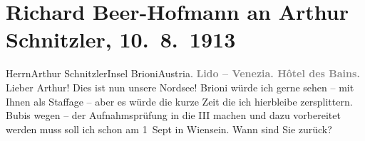 

         
         \renewcommand{\erwaehntePersonen}{Personen: Richard Beer-Hofmann, Gabriel Beer-Hofmann, Olga Schnitzler, Heinrich Schnitzler, Lili Schnitzler}
         \renewcommand{\erwaehnteOrte}{Orte: Brijuni, Grand Hotel des Bains, Lido, Santa Maria Elisabetta, Venedig, Wien, Österreich}
         \renewcommand{\erwaehnteWerke}{}
               \section[Richard Beer-Hofmann an Arthur Schnitzler, 10. 8. 1913]{ Richard Beer-Hofmann an Arthur Schnitzler, 10. 8. 1913}\nopagebreak{}\rehead{ }\begin{ledgroupsized}[t]{13cm}\normalsize\beginnumbering \toendnotes[C]{\smallbreak\pagebreak[2]} 
\toendnotes[C]{\smallbreak}\pstart{}{\pb}Herrn\pend{}\pstart{}Arthur Schnitzler\pend{}\pstart{}Insel Brioni\pend{}\pstart{}Austria.\pend{}{\bigskip}\pstart
           \noindent{}\centering{}{\pb}\textcolor{gray}{\textbf{Lido – Venezia. Hôtel des Bains.}}\pend
           \pstart
           \noindent{}{\pb}Lieber Arthur! Dies ist nun unsere Nordsee! Brioni würde ich gerne sehen – mit Ihnen als Staffage – aber es
               würde die kurze Zeit die ich hierbleibe zersplittern. Bubis wegen – der Aufnahmsprüfung in die III machen und dazu
               vorbereitet werden muss soll ich schon am 1 Sept in Wiensein. Wann sind Sie zurück?\pend

\end{ledgroupsized}
